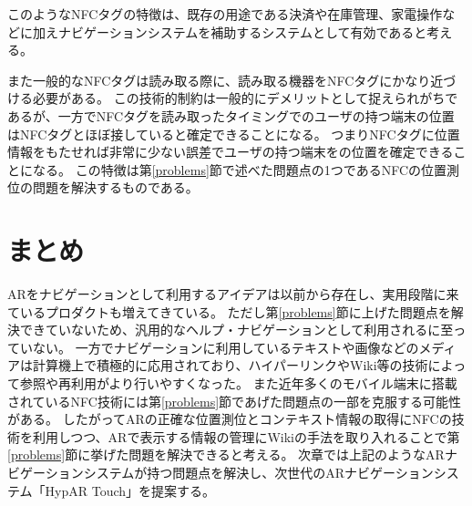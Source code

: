 このようなNFCタグの特徴は、既存の用途である決済や在庫管理、家電操作などに加えナビゲーションシステムを補助するシステムとして有効であると考える。

また一般的なNFCタグは読み取る際に、読み取る機器をNFCタグにかなり近づける必要がある。
この技術的制約は一般的にデメリットとして捉えられがちであるが、一方でNFCタグを読み取ったタイミングでのユーザの持つ端末の位置はNFCタグとほぼ接していると確定できることになる。
つまりNFCタグに位置情報をもたせれば非常に少ない誤差でユーザの持つ端末をの位置を確定できることになる。
この特徴は第\ref{problems}節で述べた問題点の1つであるNFCの位置測位の問題を解決するものである。


\section{まとめ}
ARをナビゲーションとして利用するアイデアは以前から存在し、実用段階に来ているプロダクトも増えてきている。
ただし第\ref{problems}節に上げた問題点を解決できていないため、汎用的なヘルプ・ナビゲーションとして利用されるに至っていない。
一方でナビゲーションに利用しているテキストや画像などのメディアは計算機上で積極的に応用されており、ハイパーリンクやWiki等の技術によって参照や再利用がより行いやすくなった。
また近年多くのモバイル端末に搭載されているNFC技術には第\ref{problems}節であげた問題点の一部を克服する可能性がある。
したがってARの正確な位置測位とコンテキスト情報の取得にNFCの技術を利用しつつ、ARで表示する情報の管理にWikiの手法を取り入れることで第\ref{problems}節に挙げた問題を解決できると考える。
次章では上記のようなARナビゲーションシステムが持つ問題点を解決し、次世代のARナビゲーションシステム「HypAR Touch」を提案する。